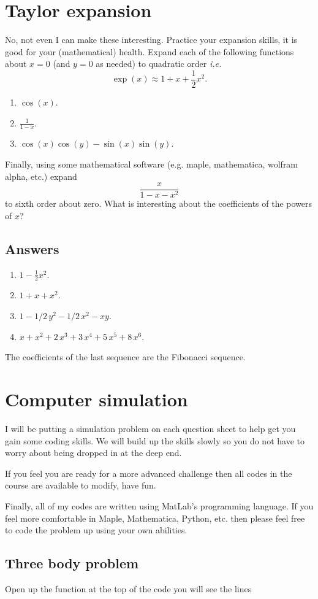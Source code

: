 \documentclass[10pt]{article}
\newcommand{\bb}{\begin{equation}}
\newcommand{\ee}{\end{equation}}
\newcommand{\ie}{\emph{i.e.} }
\begin{document}
\section{Taylor expansion}
No, not even I can make these interesting. Practice your expansion skills, it is good for your (mathematical) health. Expand each of the following functions about $x=0$ (and $y=0$ as needed) to quadratic order \ie
\bb
\exp(x)\approx 1+x+\frac{1}{2}x^2.
\ee
\begin{enumerate}
\item $\cos(x)$.
\item $\frac{1}{1-x}$.
\item $\cos(x)\cos(y)-\sin(x)\sin(y)$.
\end{enumerate}
Finally, using some mathematical software (e.g. maple, mathematica, wolfram alpha, etc.) expand 
\bb
\frac{x}{1-x-x^2}
\ee
to sixth order about zero. What is interesting about the coefficients of the powers of $x$?
\begin{Answ}
\subsection{Answers}
\begin{enumerate}
\item $1-{\frac {1}{2}}{x}^{2}$.
\item $1+x+{x}^{2}$.
\item $1-1/2\,{y}^{2}-1/2\,{x}^{2}-xy$.
\item $x+{x}^{2}+2\,{x}^{3}+3\,{x}^{4}+5\,{x}^{5}+8\,{x}^{6}$.
\end{enumerate}
The coefficients of the last sequence are the Fibonacci sequence.
\end{Answ}
\section{Computer simulation}
I will be putting a simulation problem on each question sheet to help get you gain some coding skills. We will build up the skills slowly so you do not have to worry about being dropped in at the deep end.

If you feel you are ready for a more advanced challenge then all codes in the course are available to modify, have fun.

Finally, all of my codes are written using MatLab's programming language. If you feel more comfortable in Maple, Mathematica, Python, etc. then please feel free to code the problem up using your own abilities.
\subsection*{Three body problem}
Open up the function  at the top of the code you will see the lines
\end{document}
